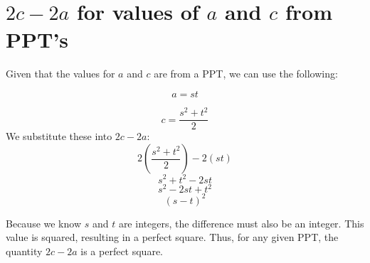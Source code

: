 \documentclass[12pt]{article}
\begin{document}
\section{$2c - 2a$ for values of $a$ and $c$ from PPT's}

Given that the values for $a$ and $c$ are from a PPT, we can use the following:

\begin{equation}
a = st
\end{equation}

\begin{equation}
c = \frac{s^2 + t^2}{2}
\end{equation}
We substitute these into $2c - 2a$:
\begin{equation}
    2\left(\frac{s^2 + t^2}{2}\right) - 2(st)
\end{equation}
\[
s^2 + t^2 - 2st
\]
\[
s^2 - 2st + t^2
\]
\[
(s - t)^2
\] 

Because we know $s$ and $t$ are integers, the difference must also be an integer. This value is squared, resulting in a perfect square. Thus, for any given PPT, the quantity $2c-2a$ is a perfect square. 
\end{document}
